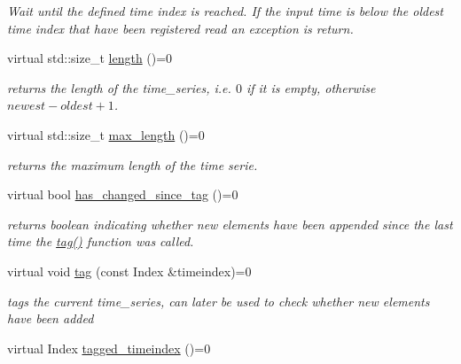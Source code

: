 \begin{DoxyCompactItemize}
\begin{DoxyCompactList}\small\item\em Wait until the defined time index is reached. If the input time is below the oldest time index that have been registered read an exception is return. \end{DoxyCompactList}\item 
virtual std\+::size\+\_\+t \hyperlink{classtime__series_1_1TimeSeriesInterface_a90f6ed15d82006dbc7ef7783d9f6ff7a}{length} ()=0\hypertarget{classtime__series_1_1TimeSeriesInterface_a90f6ed15d82006dbc7ef7783d9f6ff7a}{}\label{classtime__series_1_1TimeSeriesInterface_a90f6ed15d82006dbc7ef7783d9f6ff7a}

\begin{DoxyCompactList}\small\item\em returns the length of the time\+\_\+series, i.\+e. $0$ if it is empty, otherwise $newest - oldest +1 $. \end{DoxyCompactList}\item 
virtual std\+::size\+\_\+t \hyperlink{classtime__series_1_1TimeSeriesInterface_aded8927e82c060aa3367f17dfd59a8ec}{max\+\_\+length} ()=0
\begin{DoxyCompactList}\small\item\em returns the maximum length of the time serie. \end{DoxyCompactList}\item 
virtual bool \hyperlink{classtime__series_1_1TimeSeriesInterface_a2758b463ea41393a24ea37ccd0f5feb4}{has\+\_\+changed\+\_\+since\+\_\+tag} ()=0\hypertarget{classtime__series_1_1TimeSeriesInterface_a2758b463ea41393a24ea37ccd0f5feb4}{}\label{classtime__series_1_1TimeSeriesInterface_a2758b463ea41393a24ea37ccd0f5feb4}

\begin{DoxyCompactList}\small\item\em returns boolean indicating whether new elements have been appended since the last time the \hyperlink{classtime__series_1_1TimeSeriesInterface_a34e881c9496901127baf1d907d7399ac}{tag()} function was called. \end{DoxyCompactList}\item 
virtual void \hyperlink{classtime__series_1_1TimeSeriesInterface_a34e881c9496901127baf1d907d7399ac}{tag} (const Index \&timeindex)=0\hypertarget{classtime__series_1_1TimeSeriesInterface_a34e881c9496901127baf1d907d7399ac}{}\label{classtime__series_1_1TimeSeriesInterface_a34e881c9496901127baf1d907d7399ac}

\begin{DoxyCompactList}\small\item\em tags the current time\+\_\+series, can later be used to check whether new elements have been added \end{DoxyCompactList}\item 
virtual Index \hyperlink{classtime__series_1_1TimeSeriesInterface_aa71ab509ac29c5da681aee9dbf65f2d8}{tagged\+\_\+timeindex} ()=0\hypertarget{classtime__series_1_1TimeSeriesInterface_aa71ab509ac29c5da681aee9dbf65f2d8}{}\label{classtime__series_1_1TimeSeriesInterface_aa71ab509ac29c5da681aee9dbf65f2d8}


\end{DoxyCompactItemize}

